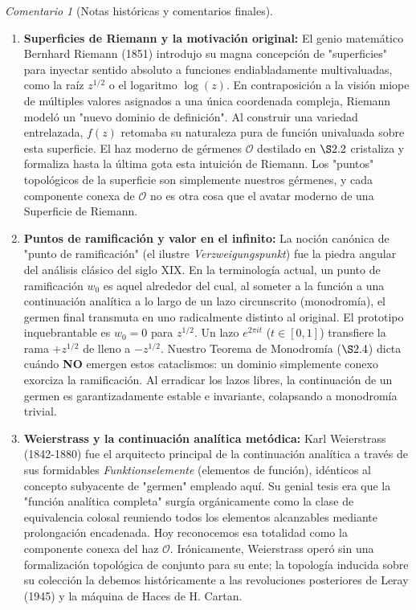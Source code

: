 \documentclass[11pt,a4paper]{article}
\theoremstyle{definition}
\theoremstyle{remark}
\newtheorem{observacion}{Comentario}[section]
\numberwithin{equation}{section}
\begin{document}
\begin{observacion}[Notas históricas y comentarios finales]
\begin{enumerate}
    \item \textbf{Superficies de Riemann y la motivación original:} El genio matemático Bernhard Riemann (1851) introdujo su magna concepción de "superficies" para inyectar sentido absoluto a funciones endiabladamente multivaluadas, como la raíz $z^{1/2}$ o el logaritmo $\log(z)$. En contraposición a la visión miope de múltiples valores asignados a una única coordenada compleja, Riemann modeló un "nuevo dominio de definición". Al construir una variedad entrelazada, $f(z)$ retomaba su naturaleza pura de función univaluada sobre esta superficie. El haz moderno de gérmenes $\mathcal{O}$ destilado en $\S2.2$ cristaliza y formaliza hasta la última gota esta intuición de Riemann. Los "puntos" topológicos de la superficie son simplemente nuestros gérmenes, y cada componente conexa de $\mathcal{O}$ no es otra cosa que el avatar moderno de una Superficie de Riemann.
    
    \item \textbf{Puntos de ramificación y valor en el infinito:} La noción canónica de "punto de ramificación" (el ilustre \textit{Verzweigungspunkt}) fue la piedra angular del análisis clásico del siglo XIX. En la terminología actual, un punto de ramificación $w_0$ es aquel alrededor del cual, al someter a la función a una continuación analítica a lo largo de un lazo circunscrito (monodromía), el germen final transmuta en uno radicalmente distinto al original. El prototipo inquebrantable es $w_0 = 0$ para $z^{1/2}$. Un lazo $e^{2\pi i t}$ ($t \in [0,1]$) transfiere la rama $+z^{1/2}$ de lleno a $-z^{1/2}$. Nuestro Teorema de Monodromía ($\S2.4$) dicta cuándo \textbf{NO} emergen estos cataclismos: un dominio simplemente conexo exorciza la ramificación. Al erradicar los lazos libres, la continuación de un germen es garantizadamente estable e invariante, colapsando a monodromía trivial.
    
    \item \textbf{Weierstrass y la continuación analítica metódica:} Karl Weierstrass (1842-1880) fue el arquitecto principal de la continuación analítica a través de sus formidables \textit{Funktionselemente} (elementos de función), idénticos al concepto subyacente de "germen" empleado aquí. Su genial tesis era que la "función analítica completa" surgía orgánicamente como la clase de equivalencia colosal reuniendo todos los elementos alcanzables mediante prolongación encadenada. Hoy reconocemos esa totalidad como la componente conexa del haz $\mathcal{O}$. Irónicamente, Weierstrass operó sin una formalización topológica de conjunto para su ente; la topología inducida sobre su colección la debemos históricamente a las revoluciones posteriores de Leray (1945) y la máquina de Haces de H. Cartan.
    

\end{enumerate}
\end{observacion}
\end{document}
